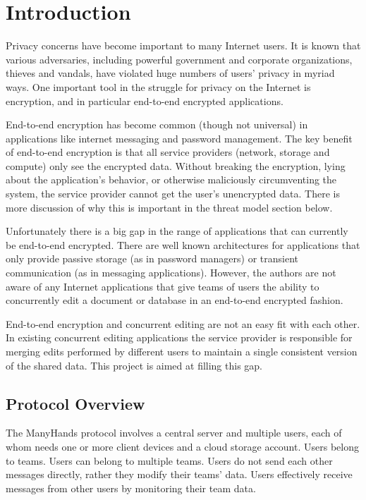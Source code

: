 \documentclass[pldi,10pt]{sigplanconf-pldi16}
\begin{document}
\section{Introduction}

Privacy concerns have become important to many Internet users.
It is known that various adversaries, including powerful government and corporate organizations, thieves and vandals, have violated huge numbers of users' privacy in myriad ways.
One important tool in the struggle for privacy on the Internet is encryption, and in particular end-to-end encrypted applications.

End-to-end encryption has become common (though not universal) in applications like internet messaging and password management.
The key benefit of end-to-end encryption is that all service providers (network, storage and compute) only see the encrypted data.
Without breaking the encryption, lying about the application's behavior, or otherwise maliciously circumventing the system, the service provider cannot get the user's unencrypted data.
There is more discussion of why this is important in the threat model section below.

Unfortunately there is a big gap in the range of applications that can currently be end-to-end encrypted.
There are well known architectures for applications that only provide passive storage (as in password managers) or transient communication (as in messaging applications).
However, the authors are not aware of any Internet applications that give teams of users the ability to concurrently edit a document or database in an end-to-end encrypted fashion.

End-to-end encryption and concurrent editing are not an easy fit with each other.
In existing concurrent editing applications the service provider is responsible for merging edits performed by different users to maintain a single consistent version of the shared data.
This project is aimed at filling this gap.

\subsection{Protocol Overview}

The ManyHands protocol involves a central server and multiple users, each of whom needs one or more client devices and a cloud storage account.
Users belong to teams.
Users can belong to multiple teams.
Users do not send each other messages directly, rather they modify their teams' data.
Users effectively receive messages from other users by monitoring their team data.
\end{document}
